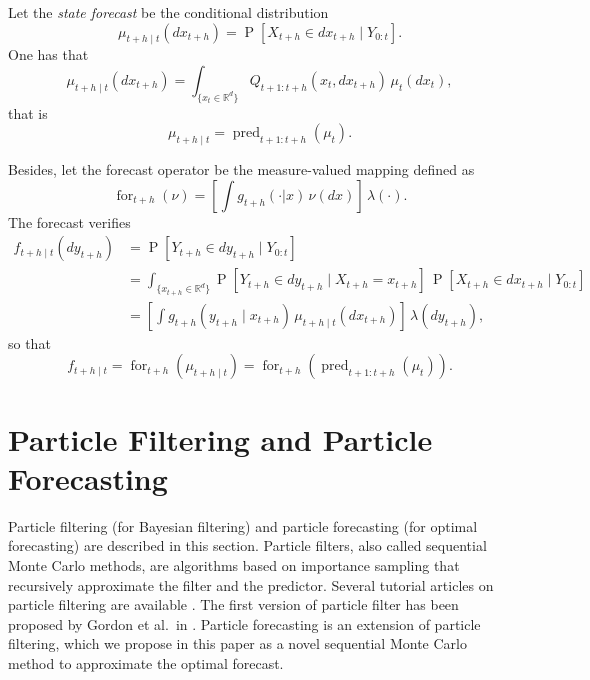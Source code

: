 \documentclass{article}
\newcommand{\R}{\mathbb R}
\DeclareMathOperator{\prob}{P}
\DeclareMathOperator{\pred}{pred}
\DeclareMathOperator{\for}{for}
\begin{document}
Let the \textit{state forecast} be the conditional distribution
\begin{equation*}
    \mu_{t+h \mid t}(dx_{t+h}) = \prob [X_{t+h} \in dx_{t+h} \mid Y_{0:t}].
\end{equation*}
One has that
\begin{equation*}
    \mu_{t+h \mid t}(dx_{t+h}) = \int_{\{x_t \in \R^d\}} Q_{t+1:t+h}(x_t,dx_{t+h}) \, \mu_t(dx_t),
\end{equation*}
that is
\begin{equation*}
    \mu_{t+h \mid t} = \pred_{t+1:t+h} (\mu_t).
\end{equation*}

Besides, let the forecast operator be the measure-valued mapping defined as
\begin{equation}
\label{eq:for-operator}
    \for_{t+h}(\nu) = [\int g_{t+h}(\cdot | x) \, \nu(dx)] \, \lambda(\cdot).
\end{equation}
The forecast verifies
\begin{align*}
    f_{t+h \mid t}(dy_{t+h}) &= \prob[Y_{t+h} \in dy_{t+h} \mid Y_{0:t}] \\
    &= \int_{\{x_{t+h} \in \R^d\}} \prob[Y_{t+h} \in dy_{t+h} \mid X_{t+h} = x_{t+h}] \, \prob[X_{t+h} \in dx_{t+h} \mid Y_{0:t}] \\
    &= [\int g_{t+h}(y_{t+h} \mid x_{t+h}) \, \mu_{t+h \mid t}(dx_{t+h})] \, \lambda(dy_{t+h}),
\end{align*}
so that
\begin{equation*}
    f_{t+h \mid t} = \for_{t+h}(\mu_{t+h \mid t}) = \for_{t+h}(\pred_{t+1:t+h} (\mu_t)).
\end{equation*}


\section{Particle Filtering and Particle Forecasting}
\label{sec:particle-approx}

Particle filtering (for Bayesian filtering) and particle forecasting (for optimal forecasting) are described in this section. Particle filters, also called sequential Monte Carlo methods, are algorithms based on importance sampling that recursively approximate the filter and the predictor. Several tutorial articles on particle filtering are available \cite{Arulampalam2002,Cappe2007,Doucet2000,Doucet2011}. The first version of particle filter has been proposed by Gordon et al.\ in \cite{Gordon1993}. Particle forecasting is an extension of particle filtering, which we propose in this paper as a novel sequential Monte Carlo method to approximate the optimal forecast.
\end{document}
